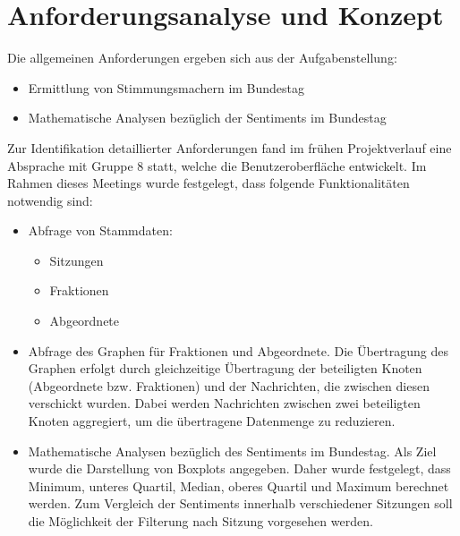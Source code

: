 \section{Anforderungsanalyse und Konzept}\label{sec:07_03_anforderungen_konzept}

Die allgemeinen Anforderungen ergeben sich aus der Aufgabenstellung:
\begin{itemize}
	\item Ermittlung von Stimmungsmachern im Bundestag
	\item Mathematische Analysen bezüglich der Sentiments im Bundestag
\end{itemize}

Zur Identifikation detaillierter Anforderungen fand im frühen Projektverlauf eine Absprache mit Gruppe 8 statt, welche die Benutzeroberfläche entwickelt.
Im Rahmen dieses Meetings wurde festgelegt, dass folgende Funktionalitäten notwendig sind:
\begin{itemize}
	\item Abfrage von Stammdaten:
	\begin{itemize}
		\item Sitzungen
		\item Fraktionen
		\item Abgeordnete
	\end{itemize}
	\item Abfrage des Graphen für Fraktionen und Abgeordnete. Die Übertragung des Graphen erfolgt durch gleichzeitige Übertragung der beteiligten Knoten (Abgeordnete bzw. Fraktionen) und der Nachrichten, die zwischen diesen verschickt wurden. Dabei werden Nachrichten zwischen zwei beteiligten Knoten aggregiert, um die übertragene Datenmenge zu reduzieren.
	\item Mathematische Analysen bezüglich des Sentiments im Bundestag. Als Ziel wurde die Darstellung von Boxplots angegeben. Daher wurde festgelegt, dass Minimum, unteres Quartil, Median, oberes Quartil und Maximum berechnet werden. Zum Vergleich der Sentiments innerhalb verschiedener Sitzungen soll die Möglichkeit der Filterung nach Sitzung vorgesehen werden.
\end{itemize}

\newpage
